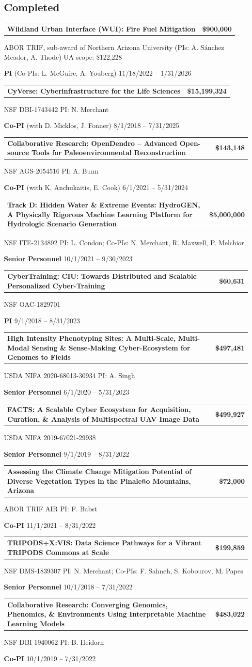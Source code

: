 \documentclass[11pt,letterpaper]{article}
\makeatletter
\newcommand{\grant}[4]{%
  \begin{tabularx}{\linewidth}{@{}X r@{}}
    \textbf{#1} & {\small\bfseries #2}
  \end{tabularx}\par
  {\small\color{muted}#3\par #4\par}\vspace{5pt}}
\makeatother
\begin{document}
\subsection{Completed}
\grant{Wildland Urban Interface (WUI): Fire Fuel Mitigation}{\$900,000}
  {ABOR TRIF, sub-award of Northern Arizona University (PIs: A. S\'anchez Meador, A. Thode) \textbullet{} UA scope: \$122,228}
  {\textbf{PI} (Co-PIs: L. McGuire, A. Youberg) \textbullet{} 11/18/2022 -- 1/31/2026}
\grant{CyVerse: Cyberinfrastructure for the Life Sciences}{\$15,199,324}
  {NSF DBI-1743442 \textbullet{} PI: N. Merchant}
  {\textbf{Co-PI} (with D. Micklos, J. Fonner) \textbullet{} 8/1/2018 -- 7/31/2025}
\grant{Collaborative Research: OpenDendro -- Advanced Open-source Tools for Paleoenvironmental Reconstruction}{\$143,148}
  {NSF AGS-2054516 \textbullet{} PI: A. Bunn}
  {\textbf{Co-PI} (with K. Anchukaitis, E. Cook) \textbullet{} 6/1/2021 -- 5/31/2024}
\grant{Track D: Hidden Water \& Extreme Events: HydroGEN, A Physically Rigorous Machine Learning Platform for Hydrologic Scenario Generation}{\$5,000,000}
  {NSF ITE-2134892 \textbullet{} PI: L. Condon; Co-PIs: N. Merchant, R. Maxwell, P. Melchior}
  {\textbf{Senior Personnel} \textbullet{} 10/1/2021 -- 9/30/2023}
\grant{CyberTraining: CIU: Towards Distributed and Scalable Personalized Cyber-Training}{\$60,631}
  {NSF OAC-1829701}
  {\textbf{PI} \textbullet{} 9/1/2018 -- 8/31/2023}
\grant{High Intensity Phenotyping Sites: A Multi-Scale, Multi-Modal Sensing \& Sense-Making Cyber-Ecosystem for Genomes to Fields}{\$497,481}
  {USDA NIFA 2020-68013-30934 \textbullet{} PI: A. Singh}
  {\textbf{Senior Personnel} \textbullet{} 6/1/2020 -- 5/31/2023}
\grant{FACTS: A Scalable Cyber Ecosystem for Acquisition, Curation, \& Analysis of Multispectral UAV Image Data}{\$499,927}
  {USDA NIFA 2019-67021-29938}
  {\textbf{Senior Personnel} \textbullet{} 9/1/2019 -- 8/31/2022}
\grant{Assessing the Climate Change Mitigation Potential of Diverse Vegetation Types in the Pinale\~no Mountains, Arizona}{\$72,000}
  {ABOR TRIF AIR \textbullet{} PI: F. Babst}
  {\textbf{Co-PI} \textbullet{} 11/1/2021 -- 8/31/2022}
\grant{TRIPODS+X:VIS: Data Science Pathways for a Vibrant TRIPODS Commons at Scale}{\$199,859}
  {NSF DMS-1839307 \textbullet{} PI: N. Merchant; Co-PIs: F. Sahneh, S. Kobourov, M. Papes}
  {\textbf{Senior Personnel} \textbullet{} 10/1/2018 -- 7/31/2022}
\grant{Collaborative Research: Converging Genomics, Phenomics, \& Environments Using Interpretable Machine Learning Models}{\$483,022}
  {NSF DBI-1940062 \textbullet{} PI: B. Heidorn}
  {\textbf{Co-PI} \textbullet{} 10/1/2019 -- 7/31/2022}
\end{document}
